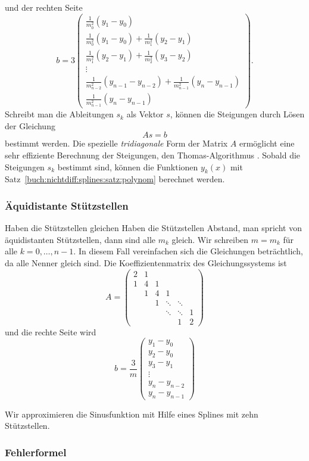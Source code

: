 und der rechten Seite
\[
\renewcommand{\arraystretch}{1.9}
b
=
3
\begin{pmatrix}
\displaystyle
\frac{1}{m_0^2}(y_1-y_0)
\\
\displaystyle
\frac{1}{m_0^2}(y_1-y_0)
+
\frac{1}{m_1^2}(y_2-y_1)
\\
\displaystyle
\frac{1}{m_1^2}(y_2-y_1)
+
\frac{1}{m_2^2}(y_3-y_2)
\\
\vdots
\\
\displaystyle
\frac{1}{m_{n-2}^2}(y_{n-1}-y_{n-2})
+
\frac{1}{m_{n-1}^2}(y_n-y_{n-1})
\\
\displaystyle
\frac{1}{m_{n-1}^2}(y_n-y_{n-1})
\end{pmatrix}.
\]
Schreibt man die Ableitungen $s_k$ als Vektor $s$, können die Steigungen
durch Lösen der Gleichung
\[
As=b
\]
bestimmt werden.
Die spezielle {\em tridiagonale} Form der Matrix $A$
%
ermöglicht eine sehr effiziente Berechnung der Steigungen, den
Thomas-Algorithmus \cite{buch:thomas}.
%
Sobald die Steigungen $s_k$ bestimmt sind, können die Funktionen
$y_k(x)$ mit Satz~\ref{buch:nichtdiff:splines:satz:polynom}
berechnet werden.

%
%
\subsubsection{Äquidistante Stützstellen}
Haben die Stützstellen gleichen Haben die Stützstellen Abstand, man
spricht von äquidistanten Stützstellen, dann sind alle $m_k$ gleich.
Wir schreiben $m=m_k$ für alle $k=0,\dots,n-1$.
In diesem Fall vereinfachen sich die Gleichungen beträchtlich, da
alle Nenner gleich sind.
Die Koeffizientenmatrix des Gleichungssystems ist
\[
A
=
\begin{pmatrix}
2 &1 &  &       &       &  \\
1 &4 &1 &       &       &  \\
  &1 &4 &1      &       &  \\[-3pt]
  &  &1 &\ddots &\ddots &  \\[-3pt]
  &  &  &\ddots &\ddots &1 \\
  &  &  &       &1      &2
\end{pmatrix}
\]
und die rechte Seite wird
\[
b
=
\frac{3}{m}
\begin{pmatrix}
y_1-y_0\\
y_2-y_0\\
y_3-y_1\\[-3pt]
\vdots\\
y_n-y_{n-2}\\
y_n-y_{n-1}
\end{pmatrix}
\]

\begin{beispiel}
Wir approximieren die Sinusfunktion mit Hilfe eines Splines mit zehn
Stützstellen.
\end{beispiel}

%
%
\subsubsection{Fehlerformel}

